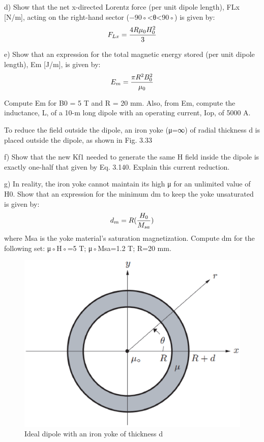 d) Show that the net x-directed Lorentz force (per unit dipole length), FLx
[N/m], acting on the right-hand sector (−90◦<θ<90◦) is given by:
$$
F_{Lx}=\frac{4R\mu_{0}H_{0}^{2}}{3}\\%
$$

e) Show that an expression for the total magnetic energy stored (per unit dipole
length), Em [J/m], is given by:
$$
E_{m}=\frac{\pi R^{2}B_{0}^{2}}{\mu_{0}}\\%
$$

Compute Em for B0 = 5 T and R = 20 mm. Also, from Em, compute the
inductance, L, of a 10-m long dipole with an operating current, Iop, of 5000 A.

To reduce the field outside the dipole, an iron yoke (μ=∞) of radial thickness d
is placed outside the dipole, as shown in Fig. 3.33

f) Show that the new Kf1 needed to generate the same H field inside the dipole
is exactly one-half that given by Eq. 3.140. Explain this current reduction.

g) In reality, the iron yoke cannot maintain its high μ for an unlimited value of
H0. Show that an expression for the minimum dm to keep the yoke unsaturated is given by:
$$
d_{m}=R(\frac{H_{0}}{M_{sa}})\\%
$$
where Msa is the yoke material’s saturation magnetization. Compute dm for
the following set: μ◦H◦=5 T; μ◦Msa=1.2 T; R=20 mm.
\begin{figure}[htbp]
	\centering
	\includegraphics[scale=0.5]{chpt3/figs/fig3.33.eps}
	\caption{Ideal dipole with an iron yoke of thickness d}
\end{figure}

